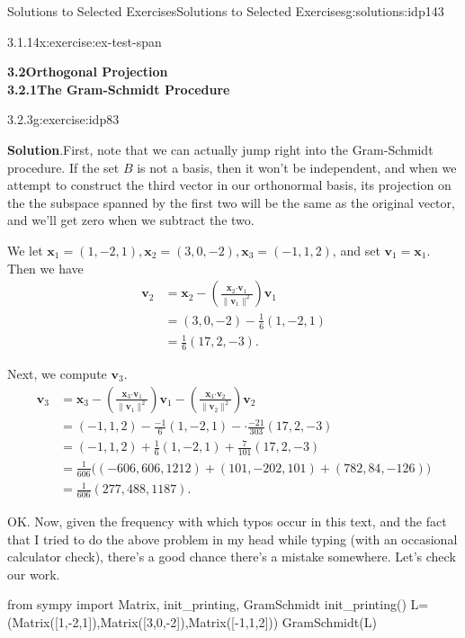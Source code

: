 \documentclass[oneside,10pt,]{book}
\newcommand{\blocktitlefont}{\relax}
\numberwithin{equation}{section}
\newcommand{\dotp}{\!\boldsymbol{\cdot}\!}
\newcommand{\len}[1]{\lVert #1\rVert}
\newcommand{\vv}{\mathbf{v}}
\newcommand{\xx}{\mathbf{x}}
\newcommand{\amp}{&}
\begin{document}
\begin{solutions-chapter}{Solutions to Selected Exercises}{}{Solutions to Selected Exercises}{}{}{g:solutions:idp143}
\begin{inlinesolution}{3.1.14}{}{x:exercise:ex-test-span}
\end{inlinesolution}%
\par\medskip
\noindent\textbf{\Large{}3.2\space\textperiodcentered\space{}Orthogonal Projection\\
3.2.1\space\textperiodcentered\space{}The Gram-Schmidt Procedure}
\begin{inlinesolution}{3.2.3}{}{g:exercise:idp83}%
\par\smallskip%
\noindent\textbf{\blocktitlefont Solution}.\hypertarget{g:solution:idp169-back}{}\quad{}First, note that we can actually jump right into the Gram-Schmidt procedure. If the set \(B\) is not a basis, then it won't be independent, and when we attempt to construct the third vector in our orthonormal basis, its projection on the the subspace spanned by the first two will be the same as the original vector, and we'll get zero when we subtract the two.%
\par
We let \(\xx_1=(1,-2,1), \xx_2=(3,0,-2), \xx_3=(-1,1,2)\), and set \(\vv_1=\xx_1\). Then we have%
\begin{align*}
\vv_2 \amp = \xx_2-\left(\frac{\xx_2\dotp \vv_1}{\len{\vv_1}^2}\right)\vv_1 \\
\amp = (3,0,-2)-\frac{1}{6}(1,-2,1)\\
\amp = \frac16(17,2,-3) \text{.}
\end{align*}
%
\par
Next, we compute \(\vv_3\).%
\begin{align*}
\vv_3 \amp = \xx_3-\left(\frac{\xx_3\dotp \vv_1}{\len{\vv_1}^2}\right)\vv_1 - \left(\frac{\xx_3\dotp \vv_2}{\len{\vv_2}^2}\right)\vv_2\\
\amp = (-1,1,2)-\frac{-1}{6}(1,-2,1)-\cdot \frac{-21}{303}(17,2,-3)\\
\amp = (-1,1,2)+\frac16(1,-2,1)+\frac{7}{101}(17,2,-3)\\
\amp = \frac{1}{606}\bigl((-606,606,1212)+(101,-202,101)+(782,84,-126)\bigr)\\
\amp = \frac{1}{606}(277,488,1187)\text{.}
\end{align*}
%
\par
OK. Now, given the frequency with which typos occur in this text, and the fact that I tried to do the above problem in my head while typing (with an occasional calculator check), there's a good chance there's a mistake somewhere. Let's check our work.%
\begin{sageinput}
from sympy import Matrix, init_printing, GramSchmidt
init_printing()
L=(Matrix([1,-2,1]),Matrix([3,0,-2]),Matrix([-1,1,2]))
GramSchmidt(L)

\end{sageinput}
\end{inlinesolution}
\end{solutions-chapter}
\end{document}
